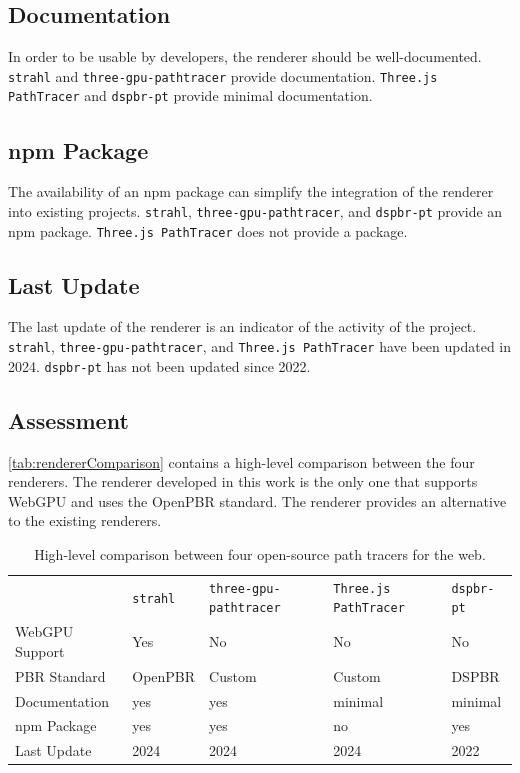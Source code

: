 \subsection*{Documentation}

In order to be usable by developers, the renderer should be well-documented. \texttt{strahl} and \texttt{three-gpu-pathtracer} provide documentation. \texttt{Three.js PathTracer} and \texttt{dspbr-pt} provide minimal documentation.

\subsection*{npm Package}

The availability of an \gls{npm} package can simplify the integration of the renderer into existing projects. \texttt{strahl}, \texttt{three-gpu-pathtracer}, and \texttt{dspbr-pt} provide an \gls{npm} package. \texttt{Three.js PathTracer} does not provide a package.

\subsection*{Last Update}

The last update of the renderer is an indicator of the activity of the project. \texttt{strahl}, \texttt{three-gpu-pathtracer}, and \texttt{Three.js PathTracer} have been updated in 2024. \texttt{dspbr-pt} has not been updated since 2022.

\subsection*{Assessment}
\autoref{tab:rendererComparison} contains a high-level comparison between the four renderers. The renderer developed in this work is the only one that supports \gls{WebGPU} and uses the \gls{OpenPBR} standard. The renderer provides an alternative to the existing renderers.

\begin{table}[H]
    \centering
    \begin{tabular}{@{}p{3cm}p{2.5cm}p{2.5cm}p{2.5cm}p{2.5cm}@{}}
    \toprule
     & \texttt{strahl} & \texttt{three-gpu-} \texttt{pathtracer} \cite{ThreeJsPathTracerJohnson} & \texttt{Three.js PathTracer} \cite{ThreeJsPathTracerLoftis} & \texttt{dspbr-pt} \cite{PathTracerDassault} \\
    \gls{WebGPU} \newline Support & Yes & No & No & No \\
    \gls{PBR} Standard & \gls{OpenPBR} & Custom & Custom & \gls{DSPBR} \\
    Documentation & yes & yes & minimal & minimal \\
    \gls{npm} Package & yes & yes & no & yes \\
    Last Update & 2024 & 2024 & 2024 & 2022 \\
    \bottomrule
    \end{tabular}
    \caption{High-level comparison between four open-source path tracers for the web.}
    \label{tab:rendererComparison}
  \end{table}

